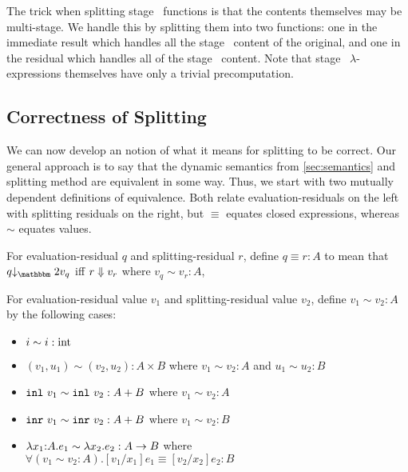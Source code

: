 The trick when splitting stage \bbone\ functions is that the contents themselves may be multi-stage.
We handle this by splitting them into two functions:
one in the immediate result which handles all the stage \bbone\ content of the original,
and one in the residual which handles all of the stage \bbtwo\ content.
Note that stage \bbone\ $\lambda$-expressions themselves have only a trivial precomputation.

%
%



\subsection{Correctness of Splitting}

We can now develop an notion of what it means for splitting to be correct.  
Our general approach is to say that the dynamic semantics from \ref{sec:semantics} and splitting method are equivalent in some way.  
Thus, we start with two mutually dependent definitions of equivalence.  
Both relate evaluation-residuals on the left with splitting residuals on the right,
but $\equiv$ equates closed expressions, whereas $\sim$ equates values.

\begin{definition}
For evaluation-residual $q$ and splitting-residual $r$, define $q \equiv r : A$ to mean that 
$q \tworedsym v_q$ iff ${r} \Downarrow {v_r}$ where $v_q \sim v_r : A$, 
\end{definition}

\begin{definition}
For evaluation-residual value $v_1$ and splitting-residual value $v_2$, define $v_1 \sim v_2 : A$ by the following cases:
\begin{itemize}
\item $i \sim i : {\rm int}$
\item $(v_1,u_1) \sim (v_2,u_2) : A \times B$ where $v_1 \sim v_2 : A$ and $u_1 \sim u_2 : B$
\item ${\tt inl}~v_1 \sim {\tt inl}~v_2 : A + B$ where $v_1 \sim v_2 : A$
\item ${\tt inr}~v_1 \sim {\tt inr}~v_2 : A + B$ where $v_1 \sim v_2 : B$
\item $\lambda{x_1}\mathrm{:}{A}.{e_1} \sim \lambda x_2.e_2 : A \to B$ where \\ $\forall (v_1 \sim v_2 : A). [v_1/x_1]e_1 \equiv [v_2/x_2]e_2 : B$
\end{itemize}
\end{definition}

